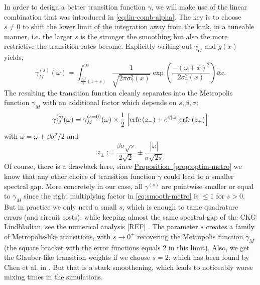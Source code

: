 In order to design a better transition function $\gamma$, we will make use of the linear combination that was introduced in \eqref{eq:lin-comb-alpha}. The key is to choose $s \neq 0$ to shift the lower limit of the integration away from the kink, in a tuneable manner, i.e. the larger $s$ is the stronger the smoothing but also the more restrictive the transition rates become. Explicitly writing out $\gamma_G$ and $g(x)$ yields,
\begin{equation} \label{eq:smooth-metro-int-defi}
    \gamma_M^{(s)}(\omega) = \int_{\frac{\beta\sigma^2}{2}(1 + s)}^\infty \frac{1}{\sqrt{2\pi \sigma_\gamma^2(x)}} \exp\left(\frac{-(\omega + x)^2}{2 \sigma_\gamma^2(x)}\right) \dd x.
\end{equation}
The resulting the transition function cleanly separates into the Metropolis function $\gamma_M$ with an additional factor which depends on $s, \beta, \sigma$:
\begin{equation} \label{eq:smooth-metro}
    \gamma_M^{(s)}(\omega) = \gamma_M^{(s=0)}(\omega) \times \frac{1}{2}\left[ \operatorname{erfc}\left(z_-\right) + e^{\beta |\tilde{\omega}|} \operatorname{erfc}\left(z_+\right) \right]
\end{equation}
with $\tilde{\omega} = \omega + \beta\sigma^2 / 2$ and 
$$
z_\pm := \frac{\beta \sigma \sqrt{s}}{2\sqrt{2}} \pm \frac{|\tilde{\omega}|}{\sigma\sqrt{2s}} 
$$
Of course, there is a drawback here, since \hyperref[prop:optim-metro]{Proposition~\ref*{prop:optim-metro}} we know that any other choice of transition function $\gamma$ could lead to a smaller spectral gap. More concretely in our case, all $\gamma^{(s)}$ are pointwise smaller or equal to $\gamma_M$ since the right multiplying factor in \eqref{eq:smooth-metro} is $\leq 1$ for $s > 0$. But in practice we only need a small $s$, which is enough to tame quadrature errors (and circuit costs), while keeping almost the same spectral gap of the CKG Lindbladian, see the numerical analysis [REF] . The parameter $s$ creates a family of Metropolis-like transitions, with $s\rightarrow 0^+$ recovering the Metropolis function $\gamma_M$ (the square bracket with the error functions equals 2 in this limit). Also, we get the Glauber-like transition weights if we choose $s = 2$, which has been found by Chen et al. in \cite{chen2023quantum}. But that is a stark smoothening, which leads to noticeably worse mixing times in the simulations.

